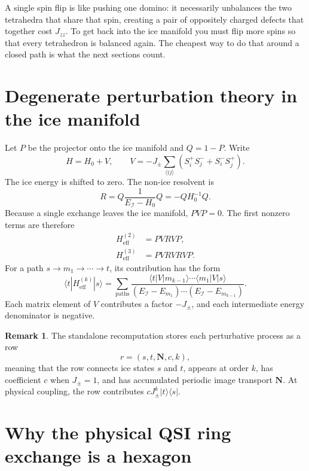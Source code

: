 \documentclass[11pt,letterpaper]{article}
\newcommand{\Jzz}{J_{zz}}
\newcommand{\Jpm}{J_{\pm}}
\newcommand{\Heff}{H_{\mathrm{eff}}}
\newcommand{\bN}{\bm N}
\newcommand{\ice}{\mathcal I}
\theoremstyle{plain}
\theoremstyle{definition}
\newtheorem{remark}{Remark}
\begin{document}
\begin{intuition}
A single spin flip is like pushing one domino: it necessarily unbalances
the two tetrahedra that share that spin, creating a pair of oppositely
charged defects that together cost $\Jzz$.  To get back into the ice manifold
you must flip more spins so that every tetrahedron is balanced again.  The
cheapest way to do that around a closed path is what the next sections count.
\end{intuition}

\section{Degenerate perturbation theory in the ice manifold}

Let $P$ be the projector onto the ice manifold and $Q=1-P$.  Write
\[
H=H_0+V,\qquad
V=-\Jpm\sum_{\langle ij\rangle}
\left(S_i^+S_j^-+S_i^-S_j^+\right).
\]
The ice energy is shifted to zero.  The non-ice resolvent is
\begin{equation}
R=Q\frac{1}{E_{\ice}-H_0}Q=-QH_0^{-1}Q .
\end{equation}
Because a single exchange leaves the ice manifold, $PVP=0$.  The first
nonzero terms are therefore
\begin{align}
\Heff^{(2)} &= PVRVP, \label{eq:heff2}\\
\Heff^{(3)} &= PVRVRVP. \label{eq:heff3}
\end{align}
For a path $s\to m_1\to \cdots \to t$, its contribution has the form
\begin{equation}
\langle t|\Heff^{(k)}|s\rangle
=
\sum_{\mathrm{paths}}
\frac{\langle t|V|m_{k-1}\rangle\cdots
\langle m_1|V|s\rangle}
{(E_\ice-E_{m_1})\cdots(E_\ice-E_{m_{k-1}})} .
\label{eq:path_pt}
\end{equation}
Each matrix element of $V$ contributes a factor $-\Jpm$, and each
intermediate energy denominator is negative.

\begin{remark}
The standalone recomputation stores each perturbative process as a row
\[
        r=(s,t,\bN,c,k),
\]
meaning that the row connects ice states $s$ and $t$, appears at order $k$,
has coefficient $c$ when $\Jpm=1$, and has accumulated periodic image
transport $\bN$.  At physical coupling, the row contributes
$c\Jpm^k|t\rangle\langle s|$.
\end{remark}

\section{Why the physical QSI ring exchange is a hexagon}
\end{document}
